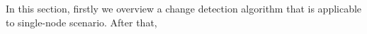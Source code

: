 \label {fs-lightbulbs-detection}

In this section, firstly we overview a change detection algorithm that is applicable to single-node scenario. After that, 